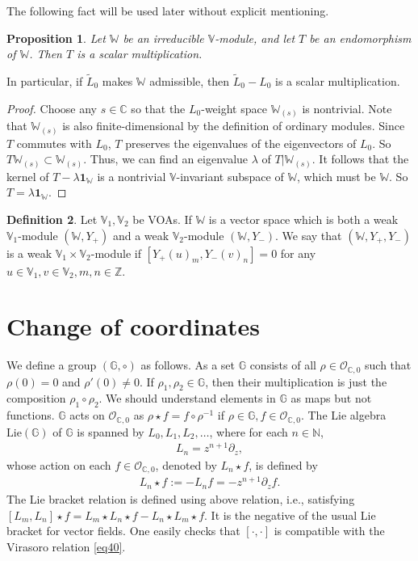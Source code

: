 \documentclass[12pt,b5paper,notitlepage]{report}
\theoremstyle{definition}
\newtheorem{df}{Definition}[section]
\theoremstyle{plain}
\newtheorem{pp}[df]{Proposition}
\newcommand{\wtd}{\widetilde}
\newcommand{\id}{\mathbf{1}}
\newcommand{\scr}{\mathscr}
\newcommand{\Vbb}{\mathbb V}
\newcommand{\Wbb}{\mathbb W}
\newcommand{\Gbb}{\mathbb G}
\newcommand{\Cbb}{\mathbb C}
\newcommand{\Nbb}{\mathbb N}
\newcommand{\Zbb}{\mathbb Z}
\newcommand{\Lie}{\mathrm{Lie}}
\numberwithin{equation}{section}
\begin{document}
The following fact will be used later without explicit mentioning.

\begin{pp}\label{lb131}
Let $\Wbb$ be an irreducible $\Vbb$-module, and let $T$ be an endomorphism of $\Wbb$. Then $T$ is a scalar multiplication. 
\end{pp}
In particular, if  $\wtd L_0$ makes $\Wbb$ admissible, then $\wtd L_0-L_0$ is a scalar multiplication.

\begin{proof}
Choose any $s\in\Cbb$ so that the $L_0$-weight space $\Wbb_{(s)}$ is nontrivial. Note that $\Wbb_{(s)}$ is also finite-dimensional by the definition of ordinary modules. Since $T$ commutes with $L_0$, $T$ preserves the eigenvalues of the eigenvectors of $L_0$. So $T\Wbb_{(s)}\subset\Wbb_{(s)}$. Thus, we can find an eigenvalue $\lambda$ of $T|\Wbb_{(s)}$. It follows that the kernel of $T-\lambda\id_\Wbb$ is a nontrivial $\Vbb$-invariant subspace of $\Wbb$, which must be $\Wbb$. So $T=\lambda\id_\Wbb$.
\end{proof}

\begin{df}\label{lb100}
Let $\Vbb_1,\Vbb_2$ be VOAs. If $\Wbb$ is a vector space which is both a weak $\Vbb_1$-module $(\Wbb,Y_+)$ and a weak $\Vbb_2$-module $(\Wbb,Y_-)$. We say that $(\Wbb,Y_+,Y_-)$ is a weak $\Vbb_1\times\Vbb_2$-module if $[Y_+(u)_m,Y_-(v)_n]=0$ for any $u\in\Vbb_1,v\in\Vbb_2,m,n\in\Zbb$.
\end{df}








\section{Change of coordinates}\label{lb52}



We define a group $(\Gbb,\circ)$ as follows. \index{G@$\Gbb,\Lie(\Gbb)$} As a set $\Gbb$ consists of all $\rho\in\scr O_{\Cbb,0}$ such that $\rho(0)=0$ and $\rho'(0)\neq 0$. If $\rho_1,\rho_2\in\Gbb$, then their multiplication is just the composition $\rho_1\circ\rho_2$. We should understand elements in $\Gbb$ as maps but not functions.  $\Gbb$ acts on $\scr O_{\Cbb,0}$ as $\rho\star f=f\circ \rho^{-1}$ if $\rho\in\Gbb,f\in\scr O_{\Cbb,0}$. The Lie algebra $\Lie(\Gbb)$ of $\Gbb$ is spanned by $L_0,L_1,L_2,\dots$, where for each $n\in\Nbb$, 
\begin{align}
L_n=z^{n+1}\partial_z,\label{eq145}
\end{align}
whose action on each $f\in\scr O_{\Cbb,0}$, denoted by $L_n\star f$, is defined by
\begin{align}
L_n\star f:=-L_nf=-z^{n+1}\partial_zf.\label{eq45}
\end{align}
The Lie bracket relation is defined using above relation, i.e., satisfying $[L_m,L_n]\star f=L_m\star L_n\star f-L_n\star L_m\star f$. It is the negative of the usual Lie bracket for vector fields. One easily checks that $[\cdot,\cdot]$ is compatible with the Virasoro relation \eqref{eq40}.
\end{document}
